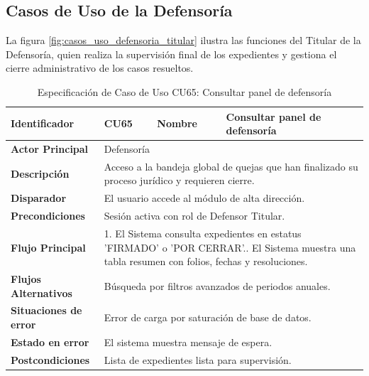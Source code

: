 \subsection{Casos de Uso de la Defensoría}
\label{subsec:casos_uso_defensoria}

La figura \ref{fig:casos_uso_defensoria_titular} ilustra las funciones del Titular de la Defensoría, quien realiza la supervisión final de los expedientes y gestiona el cierre administrativo de los casos resueltos.

\vspace{0.5cm}

\begingroup
\setlength{\parskip}{0pt}
\begin{longtable}{|p{3.5cm}|p{2cm}|p{2.5cm}|p{7cm}|}
\caption{Especificación de Caso de Uso CU65: Consultar panel de defensoría}
\label{tab:cu65} \\
\hline
\textbf{Identificador} & CU65 & \textbf{Nombre} & Consultar panel de defensoría \\ \hline
\textbf{Actor Principal} & \multicolumn{3}{p{11.5cm}|}{Defensoría} \\ \hline
\textbf{Descripción} & \multicolumn{3}{p{11.5cm}|}{Acceso a la bandeja global de quejas que han finalizado su proceso jurídico y requieren cierre.} \\ \hline
\textbf{Disparador} & \multicolumn{3}{p{11.5cm}|}{El usuario accede al módulo de alta dirección.} \\ \hline
\textbf{Precondiciones} & \multicolumn{3}{p{11.5cm}|}{Sesión activa con rol de Defensor Titular.} \\ \hline
\textbf{Flujo Principal} & \multicolumn{3}{p{11.5cm}|}{1. El Sistema consulta expedientes en estatus 'FIRMADO' o 'POR CERRAR'.\newline 2. El Sistema muestra una tabla resumen con folios, fechas y resoluciones.} \\ \hline
\textbf{Flujos Alternativos} & \multicolumn{3}{p{11.5cm}|}{Búsqueda por filtros avanzados de periodos anuales.} \\ \hline
\textbf{Situaciones de error} & \multicolumn{3}{p{11.5cm}|}{Error de carga por saturación de base de datos.} \\ \hline
\textbf{Estado en error} & \multicolumn{3}{p{11.5cm}|}{El sistema muestra mensaje de espera.} \\ \hline
\textbf{Postcondiciones} & \multicolumn{3}{p{11.5cm}|}{Lista de expedientes lista para supervisión.} \\ \hline
\end{longtable}
\endgroup

